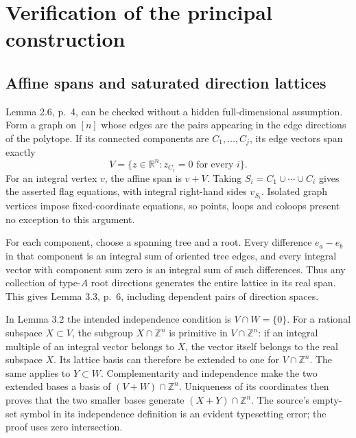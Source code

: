 \documentclass[10pt]{article}
\begin{document}
\section*{Verification of the principal construction}
\subsection*{Affine spans and saturated direction lattices}
Lemma 2.6, p. 4, can be checked without a hidden full-dimensional assumption. Form a graph on \([n]\) whose edges are the pairs appearing in the edge directions of the polytope. If its connected components are \(C_1,\ldots,C_j\), its edge vectors span exactly \[V=\{z\in\mathbb R^n:z_{C_i}=0\text{ for every }i\}.\] For an integral vertex \(v\), the affine span is \(v+V\). Taking \(S_i=C_1\cup\cdots\cup C_i\) gives the asserted flag equations, with integral right-hand sides \(v_{S_i}\). Isolated graph vertices impose fixed-coordinate equations, so points, loops and coloops present no exception to this argument.\par
For each component, choose a spanning tree and a root. Every difference \(e_a-e_b\) in that component is an integral sum of oriented tree edges, and every integral vector with component sum zero is an integral sum of such differences. Thus any collection of type-\(A\) root directions generates the entire lattice in its real span. This gives Lemma 3.3, p. 6, including dependent pairs of direction spaces.\par
In Lemma 3.2 the intended independence condition is \(V\cap W=\{0\}\). For a rational subspace \(X\subset V\), the subgroup \(X\cap\mathbb Z^n\) is primitive in \(V\cap\mathbb Z^n\): if an integral multiple of an integral vector belongs to \(X\), the vector itself belongs to the real subspace \(X\). Its lattice basis can therefore be extended to one for \(V\cap\mathbb Z^n\). The same applies to \(Y\subset W\). Complementarity and independence make the two extended bases a basis of \((V+W)\cap\mathbb Z^n\). Uniqueness of its coordinates then proves that the two smaller bases generate \((X+Y)\cap\mathbb Z^n\). The source’s empty-set symbol in its independence definition is an evident typesetting error; the proof uses zero intersection.\par
\end{document}
